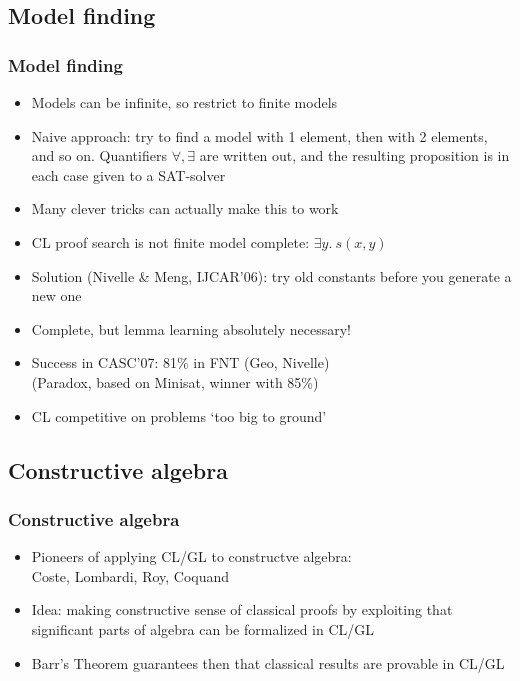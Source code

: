 \documentclass[handout,11pt]{beamer}
\newcommand{\weg}[1]{}
\begin{document}
\subsection{Model finding}

\begin{frame}
\frametitle{Model finding}
 \begin{itemize}[<+->]   %
    \item Models can be infinite, so restrict to finite models
    \item Naive approach: try to find a model with 1 element,
    then with 2 elements, and so on. Quantifiers $\forall,\exists$
    are written out, and the resulting proposition
    is in each case given to a SAT-solver
    \item Many clever tricks can actually make this to work
    \item CL proof search is not finite model complete: $\exists y.~s(x,y)$
    \item Solution (Nivelle \& Meng, IJCAR'06): try old constants
    before you generate a new one
    \item Complete, but lemma learning \alert{absolutely necessary}!
    \item Success in CASC'07: 81\% in FNT (Geo, Nivelle)\\
             (Paradox, based on Minisat, winner with 85\%)
    \item CL competitive on problems `too big to ground'
 \end{itemize}
\end{frame}              


\weg{
\begin{frame}[label=nDPmodel]
\small
\end{frame}

\frame
  {    
    \frametitle{Model} \vspace*{-.95in}
    \scalebox{0.40}
      {
    \texttt{[image: tree\_dpe]}
      }
  }
}%

\subsection{Constructive algebra}

\begin{frame}
\frametitle{Constructive algebra}
 \begin{itemize}[<+->]   %
    \item Pioneers of applying CL/GL to constructve algebra:\\
  Coste, Lombardi, Roy, %
Coquand
    \item Idea: making constructive sense of classical proofs by
  exploiting that significant parts of algebra can be formalized in CL/GL
    \item Barr's Theorem guarantees then that classical results are provable in CL/GL
 \end{itemize}
\end{frame}
\end{document}
